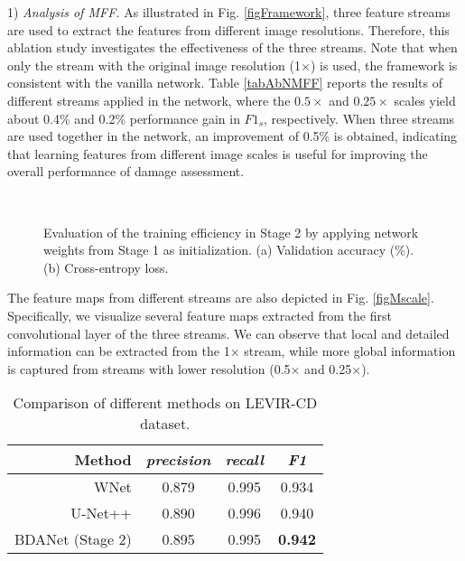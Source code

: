 \documentclass[journal]{IEEEtran}
\begin{document}
1) \textit{Analysis of MFF.} As illustrated in Fig. \ref{figFramework}, three feature streams are used to extract the features from different image resolutions. Therefore, this ablation study investigates the effectiveness of the three streams. Note that when only the stream with the original image resolution (1$\times$) is used, the framework is consistent with the vanilla network. Table \ref{tabAbNMFF} reports the results of different streams applied in the network, where the $0.5\times$ and $0.25\times$ scales yield about 0.4\% and 0.2\% performance gain in $F1_s$,
respectively. When three streams are used together in the network, an improvement of 0.5\% is obtained, indicating that learning features from different image scales is useful for improving the overall performance of damage assessment.

\begin{figure}[t]
	\centering
	           \\
	\caption{Evaluation of the training efficiency in Stage 2 by applying network weights from Stage 1 as initialization. (a) Validation accuracy (\%). (b) Cross-entropy loss. }
	\label{figCurve}
\end{figure}

The feature maps from different streams are also depicted in Fig. \ref{figMscale}. Specifically, we visualize several feature maps extracted from the first convolutional layer of the three streams.  We can observe that local and detailed information can be extracted from the 1$\times$ stream, while more global information is captured from streams with lower resolution (0.5$\times$ and 0.25$\times$).



\begin{table}[t]
	\centering
	\caption{Comparison of different methods on LEVIR-CD dataset.}
	\setlength{\tabcolsep}{2.6mm} {
		\begin{tabular}{r|ccc}
			\hline \hline
		Method & \textit{precision} & \textit{recall} & \textit{F1} \\
		\hline
	     WNet \cite{houWNetCDGANBitemporal2020} &0.879 &	 0.995 &	0.934  \\
        U-Net++ \cite{pengEndtoEndChangeDetection2019} & 0.890 &	0.996	&0.940  \\
	BDANet (Stage 2) & 0.895 	& 0.995	& \textbf{0.942}  \\
\hline	\hline	
	\end{tabular}}
	\label{tabCD}
\end{table}
\end{document}
